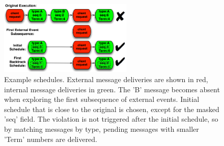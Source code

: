 \begin{figure}[!t]
\centering
\includegraphics[width=2.5in]{./image/schedule.png}
\caption{Example schedules. External message deliveries are shown
in red, internal message deliveries in green.  The 'B' message becomes absent when exploring the first subsequence of external events. Initial schedule that is close to the original is chosen, except for the masked 'seq' field. The violation is not triggered after the initial schedule, so by matching messages by type, pending messages with smaller 'Term' numbers are delivered.}
\label{fig:schedule}
\setlength{\belowcaptionskip}{-3pt}
\end{figure}
